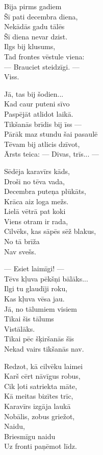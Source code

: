 \documentclass[14pt]{extarticle}
\begin{document}
{{Bija pirms gadiem\\
Šī pati decembra diena,\\
Nekādās gadu tālēs\\
Šī diena nevar dzist.\\
Ilgs bij klusums,\\
Tad frontes vēstule viena:\\
--- Brauciet steidzīgi. ---\\
Viss. 

Jā, tas bij šodien...\\
Kad caur puteni sīvo\\
Paspējāt atlidot laikā.\\
Tikšanās brīdis bij īss ---\\
Pārāk maz stundu šai pasaulē\\
Tēvam bij atlicis dzīvot,\\
Ārsts teica: --- Divas, trīs... ---

Sēdēja karavīrs kāds,\\
Droši no tēva vada,\\
Decembra puteņa plūkāts,\\
Krāca aiz loga mežs.\\
Lielā vētrā pat koki\\
Viens otram ir rada,\\
Cilvēks, kas sāpēs sēž blakus,\\
No tā brīža\\
Nav svešs. 

--- Esiet laimīgi! ---\\
Tēvs kļuva pēkšņi bālāks...\\
Ilgi tu glaudīji roku,\\
Kas kļuva vēsa jau.\\
Jā, no tālumiem visiem\\
Tikai šis tālums\\
Vistālāks.\\
Tikai pēc šķiršanās šīs\\
Nekad vairs tikšanās nav. 

Redzot, kā cilvēku laimei\\
Karš cērt nāvīgus robus,\\
Cik ļoti satriekta māte,\\
Kā meitas bizītes trīc,\\
Karavīrs izgāja laukā\\
Nobālis, zobus griežot,\\
Naidu,\\
Briesmīgu naidu\\
Uz fronti paņēmot līdz. 


}}
\end{document}
